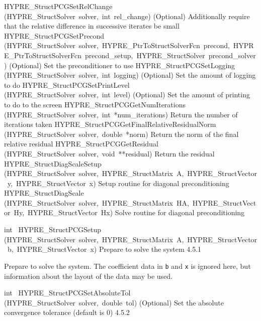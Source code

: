 \documentclass{article}
\begin{document}
\begin{cxxentry}
\begin{cxxentry}
\begin{cxxnames}
        {}
\label{cxx.4.5.8}
        {HYPRE\_StructPCGSetRelChange}
        {(HYPRE\_StructSolver\ solver,\ int\ rel\_change)}
        {
(Optional) Additionally require that the relative difference in
successive iterates be small}
        {}
\label{cxx.4.5.9}
        {HYPRE\_StructPCGSetPrecond}
        {(HYPRE\_StructSolver\ solver,\ HYPRE\_PtrToStructSolverFcn\ precond,\ HYPRE\_PtrToStructSolverFcn\ precond\_setup,\ HYPRE\_StructSolver\ precond\_solver)}
        {
(Optional) Set the preconditioner to use}
        {}
\label{cxx.4.5.10}
        {HYPRE\_StructPCGSetLogging}
        {(HYPRE\_StructSolver\ solver,\ int\ logging)}
        {
(Optional) Set the amount of logging to do}
        {}
\label{cxx.4.5.11}
        {HYPRE\_StructPCGSetPrintLevel}
        {(HYPRE\_StructSolver\ solver,\ int\ level)}
        {
(Optional) Set the amount of printing to do to the screen}
        {}
\label{cxx.4.5.12}
        {HYPRE\_StructPCGGetNumIterations}
        {(HYPRE\_StructSolver\ solver,\ int\ *num\_iterations)}
        {
Return the number of iterations taken}
        {}
\label{cxx.4.5.13}
        {HYPRE\_StructPCGGetFinalRelativeResidualNorm}
        {(HYPRE\_StructSolver\ solver,\ double\ *norm)}
        {
Return the norm of the final relative residual}
        {}
\label{cxx.4.5.14}
        {HYPRE\_StructPCGGetResidual}
        {(HYPRE\_StructSolver\ solver,\ void\ **residual)}
        {
Return the residual}
        {}
\label{cxx.4.5.15}
        {HYPRE\_StructDiagScaleSetup}
        {(HYPRE\_StructSolver\ solver,\ HYPRE\_StructMatrix\ A,\ HYPRE\_StructVector\ y,\ HYPRE\_StructVector\ x)}
        {
Setup routine for diagonal preconditioning}
        {}
\label{cxx.4.5.16}
        {HYPRE\_StructDiagScale}
        {(HYPRE\_StructSolver\ solver,\ HYPRE\_StructMatrix\ HA,\ HYPRE\_StructVector\ Hy,\ HYPRE\_StructVector\ Hx)}
        {
Solve routine for diagonal preconditioning}
        {}
\label{cxx.4.5.17}
\end{cxxnames}
\begin{cxxfunction}
{int\ }
        {HYPRE\_StructPCGSetup}
        {(HYPRE\_StructSolver\ solver,\ HYPRE\_StructMatrix\ A,\ HYPRE\_StructVector\ b,\ HYPRE\_StructVector\ x)}
        {
Prepare to solve the system}
        {4.5.1}
\begin{cxxdoc}

Prepare to solve the system.  The coefficient data in {\tt b} and {\tt x} is
ignored here, but information about the layout of the data may be used.
\end{cxxdoc}
\end{cxxfunction}
\begin{cxxfunction}
{int\ }
        {HYPRE\_StructPCGSetAbsoluteTol}
        {(HYPRE\_StructSolver\ solver,\ double\ tol)}
        {
(Optional) Set the absolute convergence tolerance (default is
0)}
        {4.5.2}
\begin{cxxdoc}


\end{cxxdoc}
\end{cxxfunction}
\end{cxxentry}
\end{cxxentry}
\end{document}
